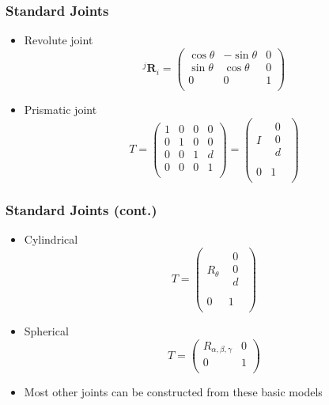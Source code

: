 \documentclass[10pt]{beamer}
\begin{document}
\begin{frame}
  \frametitle{Standard Joints}
  \begin{itemize}
  \item Revolute joint
    \[
      ^{j}\mathbf{R}_i = \left(
        \begin{array}{ccc}
          \cos \theta & -\sin \theta & 0\\
          \sin \theta & \cos \theta  & 0\\
          0 & 0 & 1\\
        \end{array}
      \right)
    \]
  \item Prismatic joint
    \[
      T = \left(
        \begin{array}{cccc}
          1 & 0 & 0 & 0 \\
          0 & 1 & 0 & 0 \\
          0 & 0 & 1 & d \\
          0 & 0 & 0 & 1 \\
        \end{array}\right)
      = \left(
        \begin{array}{cc}
          I & \begin{array}{c} 0 \\ 0 \\ d \\ \end{array} \\
          0 & 1 \\
        \end{array} \right)
    \]
  \end{itemize}
\end{frame}

\begin{frame}
  \frametitle{Standard Joints (cont.)}
  \begin{itemize}
  \item Cylindrical
    \[
      T = \left(
        \begin{array}{cc}
          R_{\theta} & \begin{array}{c} 0 \\ 0 \\ d \\ \end{array} \\
          0 & 1 \\
        \end{array} \right)
    \]
  \item Spherical
    \[
      T = \left(
        \begin{array}{cc}
          R_{\alpha,\beta,\gamma} & 0 \\
          0 & 1 \\
        \end{array} \right)
    \]
  \item Most other joints can be constructed from these basic models
  \end{itemize}
\end{frame}
\end{document}
